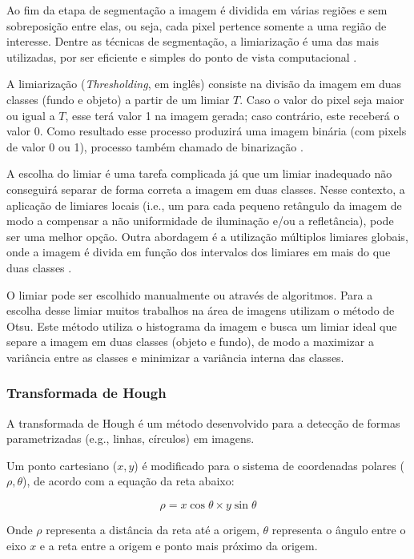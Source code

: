 \documentclass[12pt, a4paper, english, brazil]{article}
\begin{document}
Ao fim da etapa de segmentação a imagem é dividida em várias regiões e sem sobreposição entre elas, ou seja, cada pixel pertence somente a uma região de interesse. Dentre as técnicas de segmentação, a limiarização é uma das mais utilizadas, por ser eficiente e simples do ponto de vista computacional \cite{Kuruvilla_2016}.

A limiarização (\textit{Thresholding}, em inglês) consiste na divisão da imagem em duas classes (fundo e objeto) a partir de um limiar $T$. Caso o valor do pixel seja maior ou igual a $T$, esse terá valor 1 na imagem gerada; caso contrário, este receberá o valor 0. Como resultado esse processo produzirá uma imagem binária (com pixels de valor 0 ou 1), processo também chamado de binarização \cite{Marques_Filho_1999}.

A escolha do limiar é uma tarefa complicada já que um limiar inadequado não conseguirá separar de forma correta a imagem em duas classes. Nesse contexto, a aplicação de limiares locais (i.e., um para cada pequeno retângulo da imagem de modo a compensar a não uniformidade de iluminação e/ou a refletância), pode ser uma melhor opção. Outra abordagem é a utilização múltiplos limiares globais, onde a imagem é divida em função dos intervalos dos limiares em mais do que duas classes \cite{Gonzalez_Woods_2010}.

O limiar pode ser escolhido manualmente ou através de algoritmos. Para a escolha desse limiar muitos trabalhos na área de imagens utilizam o método de Otsu. Este método \cite{Otsu_1979} utiliza o histograma da imagem e busca um limiar ideal que separe a imagem em duas classes (objeto e fundo), de modo a maximizar a variância entre as classes e minimizar a variância interna das classes.

\subsubsection{Transformada de Hough}
A transformada de Hough é um método desenvolvido para a detecção de formas parametrizadas (e.g., linhas, círculos) em imagens.


Um ponto cartesiano ($x, y$) é modificado para o sistema de coordenadas polares ($\rho, \theta$), de acordo com a equação da reta abaixo:

\begin{equation}
\rho = x \cos \theta \times y \sin \theta
\label{equa:hough}
\end{equation}

 Onde $\rho$ representa a distância da reta até a origem, $\theta$ representa o ângulo entre o eixo $x$ e a reta entre a origem e ponto mais próximo da origem.
\end{document}
